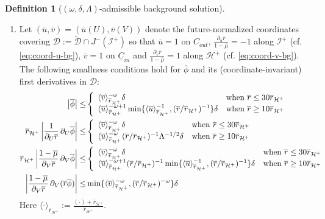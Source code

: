 \documentclass[10pt, reqno]{amsart}
\theoremstyle{definition}
\newtheorem{definition}[theorem]{Definition}
\theoremstyle{remark}
\theoremstyle{conjecture}
\numberwithin{equation}{section}
\newcommand{\brk}[1]{\langle#1\rangle}
\newcommand{\set}[1]{\{#1\}}
\newcommand{\rd}{\partial}
\newcommand{\0}{\emptyset}
\newcommand{\dlt}{\delta}
\newcommand{\Lmb}{\Lambda}
\newcommand{\omg}{\omega}
\newcommand{\calD}{\mathcal D}
\newcommand{\calH}{\mathcal H}
\newcommand{\calI}{\mathcal I}
\newcommand{\uC}{\underline{C}}
\newcommand{\EH}{\calH^{+}}
\newcommand{\NI}{\calI^{+}}						%
\newcommand{\ubg}{\overline{u}}					%
\newcommand{\vbg}{\overline{v}}					%
\newcommand{\phibg}{\overline{\phi}}				%
\newcommand{\rbg}{\overline{r}}					%
\newcommand{\mubg}{\overline{\mu}}				%
\newcommand{\Abs}[1]{\left\vert #1 \right\vert}
\begin{document}
\begin{definition} [$(\omg, \dlt, \Lambda)$-admissible background solution]
\begin{enumerate}
\item Let $(\ubg, \vbg) = (\ubg(U), \vbg(V))$ denote the future-normalized coordinates covering $\calD:=\widetilde{\calD}\cap J^-(\NI)$ so that $\ubg = 1$ on $C_{out}$, $\frac{\rd_{\ubg} \rbg}{1 - \mubg} = -1$ along $\NI$ (cf. \eqref{eq:coord-u-bg}), $\vbg = 1$ on $\uC_{in}$ and $\frac{\rd_{\vbg} \rbg}{1 - \mubg} = 1$ along $\EH$ (cf. \eqref{eq:coord-v-bg}). The following smallness conditions hold for $\phibg$ and its (coordinate-invariant) first derivatives in $\calD$: 
\begin{align} 
	\Abs{\phibg} 
\leq &	\left\{
\begin{array}{ll}
\brk{\vbg}_{\rbg_{\EH}}^{-\omg} \dlt & \hbox{when } \rbg \leq 30 \rbg_{\EH} \\
\brk{\ubg}_{\rbg_{\EH}}^{-\omg+1} \min \set{\brk{\ubg}_{\rbg_{\EH}}^{-1}, (\rbg / \rbg_{\EH})^{-1}} \dlt  & \hbox{when } \rbg \geq 10 \rbg_{\EH} \\
\end{array}\right. 	\label{eq:dlt-adm:phi}
\\
%
	\rbg_{\EH} \Abs{\frac{1}{\rd_{U} \rbg} \, \rd_{U} \phibg} 
\leq &	\left\{
\begin{array}{ll}
\brk{\vbg}_{\rbg_{\EH}}^{-\omg}  \dlt & \hbox{when } \rbg \leq 30 \rbg_{\EH} \\
\brk{\ubg}_{\rbg_{\EH}}^{-\omg} (\rbg / \rbg_{\EH})^{-1} \Lmb^{-1/2} \dlt  & \hbox{when } \rbg \geq 10 \rbg_{\EH} \\
\end{array}\right. 	\label{eq:dlt-adm:duphi} \\
%
	\rbg_{\EH} \Abs{\frac{1-\mubg}{\rd_{V} \rbg} \, \rd_{V} \phibg} 
\leq &	\left\{
\begin{array}{ll}
\brk{\vbg}_{\rbg_{\EH}}^{-\omg} \dlt & \hbox{when } \rbg \leq 30 \rbg_{\EH} \\
\brk{\ubg}_{\rbg_{\EH}}^{-\omg+1} (\rbg / \rbg_{\EH})^{-1} \min \set{\brk{\ubg}_{\rbg_{\EH}}^{-1}, (\rbg / \rbg_{\EH})^{-1}} \dlt  & \hbox{when } \rbg \geq 10 \rbg_{\EH} \\
\end{array}\right.  \label{eq:dlt-adm:dvphi} \\
%
\Abs{\frac{1-\mubg}{\rd_{V} \rbg} \, \rd_{V} (\rbg \phibg)} 
\leq & \min\set{\brk{\vbg}_{\rbg_{\EH}}^{-\omg}, (\rbg / \rbg_{\EH})^{-\omg}} \dlt	\label{eq:dlt-adm:dvrphi}
\end{align}
Here $\brk{\cdot}_{\rbg_{\EH}} := \frac{(\cdot) + \rbg_{\EH}}{\rbg_{\EH}}$.


\end{enumerate}
\end{definition}
\end{document}
